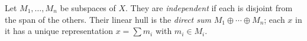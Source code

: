 Let $M_1, \ldots, M_n$ be subspaces of $X$. They are \emph{independent} if each is disjoint from the span of the others. Their linear hull is the \emph{direct sum} $M_1 \oplus \cdots \oplus M_n$; each $x$ in it has a unique representation $x = \sum m_i$ with $m_i \in M_i$.
